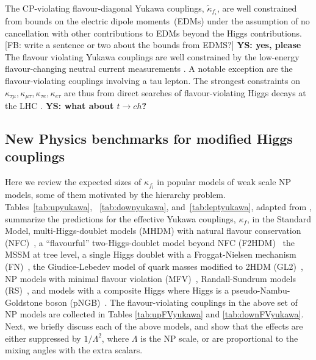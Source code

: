 \documentclass[../report.tex]{subfiles}
\begin{document}
The CP-violating flavour-diagonal Yukawa couplings, $\tilde \kappa_{f_i}$,
are well constrained from bounds on the electric dipole moments~(EDMs)
\cite{Brod:2013cka,Chien:2015xha,Altmannshofer:2015qra,Brod:2018pli} under the assumption of no 
cancellation with other contributions to EDMs beyond the Higgs contributions. {\color{blue} [FB: write a sentence or two about the bounds from EDMS?]}
{\bf YS: yes, please} 
The flavour violating Yukawa couplings are well constrained by the low-energy
flavour-changing neutral current measurements
\cite{Harnik:2012pb,Blankenburg:2012ex,Gorbahn:2014sha}. A notable
exception are the flavour-violating couplings involving a tau lepton. The
strongest constraints on $\kappa_{\tau\mu}, \kappa_{\mu\tau},
\kappa_{\tau e}, \kappa_{e \tau}$ are thus from direct searches of flavour-violating Higgs decays at
the LHC \cite{Sirunyan:2017xzt,Aad:2016blu}.
{\bf YS: what about $t\to ch$?}


\subsection{New Physics benchmarks for modified Higgs couplings}

Here we review the expected sizes of $\kappa_{f_i}$ in popular models of weak scale NP models, some of them motivated by the hierarchy problem. 
Tables~\ref{tab:upyukawa}, ~\ref{tab:downyukawa},
and~\ref{tab:leptyukawa}, adapted from
\cite{Bishara:2015cha,Dery:2014kxa,Dery:2013aba,Dery:2013rta,Bauer:2015kzy},
summarize the predictions for the effective Yukawa couplings,
$\kappa_f$, in the Standard Model, multi-Higgs-doublet models
(MHDM) with natural flavour conservation (NFC)~\cite{Glashow:1976nt,
  Paschos:1976ay}, a ``flavourful'' two-Higgs-doublet model beyond NFC
(F2HDM)~\cite{Altmannshofer:2015esa, Altmannshofer:2016zrn, 
Altmannshofer:2017uvs, Altmannshofer:2018bch} the MSSM at tree level, 
a single Higgs doublet with
a Froggat-Nielsen mechanism (FN)~\cite{Froggatt:1978nt}, the
Giudice-Lebedev model of quark masses modified to 2HDM
(GL2)~\cite{Giudice:2008uua}, NP models with minimal flavour violation
(MFV)~\cite{D'Ambrosio:2002ex}, Randall-Sundrum models
(RS)~\cite{Randall:1999ee}, and models with a composite Higgs where
Higgs is a pseudo-Nambu-Goldstone boson (pNGB)~\cite{Dugan:1984hq,
  Georgi:1984ef, Kaplan:1983sm, Kaplan:1983fs}. The flavour-violating
couplings in the above set of NP models are collected in Tables
\ref{tab:upFVyukawa} and \ref{tab:downFVyukawa}. Next, we briefly
discuss each of the above models, and show that the effects are either
suppressed by $1/\Lambda^2$, where $\Lambda$ is the NP scale, or are
proportional to the mixing angles with the extra scalars.
\end{document}
